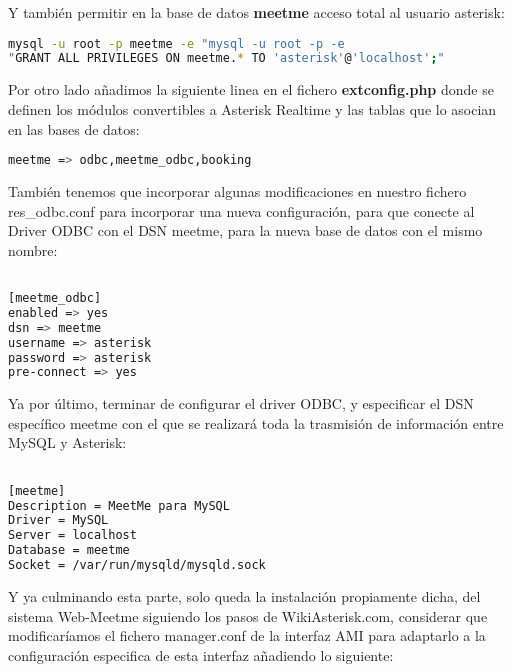 {Y también permitir en la base de datos \textbf{meetme} acceso total al usuario asterisk:

\begin{lstlisting}[language=sh]
mysql -u root -p meetme -e "mysql -u root -p -e 
"GRANT ALL PRIVILEGES ON meetme.* TO 'asterisk'@'localhost';"
\end{lstlisting}

Por otro lado añadimos la siguiente linea en el fichero \textbf{extconfig.php} donde se definen los módulos convertibles a Asterisk Realtime y las tablas que lo asocian en las bases de datos:

\begin{lstlisting}[language=bash,title={/etc/asterisk/extconfig.conf}]
meetme => odbc,meetme_odbc,booking
\end{lstlisting}

También tenemos que incorporar algunas modificaciones en nuestro fichero res\_odbc.conf para incorporar una nueva configuración, para que conecte al Driver ODBC con el DSN meetme, para la nueva base de datos con el mismo nombre:

\begin{lstlisting}[language=bash,title={/etc/asterisk/res\_odbc.conf}]

[meetme_odbc]
enabled => yes
dsn => meetme
username => asterisk
password => asterisk
pre-connect => yes

\end{lstlisting}

Ya por último, terminar de configurar el driver ODBC, y especificar el DSN específico meetme con el que se realizará toda la trasmisión de información entre MySQL y Asterisk:

\begin{lstlisting}[language=bash,title={/etc/odbc.ini}]

[meetme]
Description = MeetMe para MySQL
Driver = MySQL
Server = localhost
Database = meetme
Socket = /var/run/mysqld/mysqld.sock

\end{lstlisting}

Y ya culminando esta parte, solo queda la instalación propiamente dicha, del sistema Web-Meetme siguiendo los pasos de WikiAsterisk.com, considerar que modificaríamos el fichero manager.conf de la interfaz AMI para adaptarlo a la configuración especifica de esta interfaz añadiendo lo siguiente:

\begin{lstlisting}[language=bash,title={/etc/asterisk/manager.conf}]


\end{lstlisting}}
